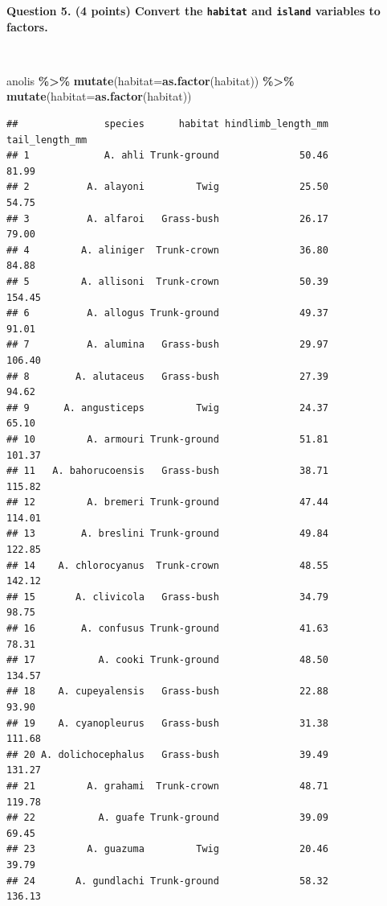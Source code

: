 \documentclass[
]{article}
\newenvironment{Shaded}{\begin{snugshade}}{\end{snugshade}}
\newcommand{\AttributeTok}[1]{\textcolor[rgb]{0.13,0.29,0.53}{#1}}
\newcommand{\FunctionTok}[1]{\textcolor[rgb]{0.13,0.29,0.53}{\textbf{#1}}}
\newcommand{\NormalTok}[1]{#1}
\newcommand{\SpecialCharTok}[1]{\textcolor[rgb]{0.81,0.36,0.00}{\textbf{#1}}}
\begin{document}
\textbf{Question 5. (4 points) Convert the \texttt{habitat} and
\texttt{island} variables to factors.}\\
\strut \\

\begin{Shaded}
\begin{Highlighting}[]
\NormalTok{anolis }\SpecialCharTok{\%\textgreater{}\%} 
  \FunctionTok{mutate}\NormalTok{(}\AttributeTok{habitat=}\FunctionTok{as.factor}\NormalTok{(habitat)) }\SpecialCharTok{\%\textgreater{}\%} 
  \FunctionTok{mutate}\NormalTok{(}\AttributeTok{habitat=}\FunctionTok{as.factor}\NormalTok{(habitat)) }
\end{Highlighting}
\end{Shaded}

\begin{verbatim}
##               species      habitat hindlimb_length_mm tail_length_mm
## 1             A. ahli Trunk-ground              50.46          81.99
## 2          A. alayoni         Twig              25.50          54.75
## 3          A. alfaroi   Grass-bush              26.17          79.00
## 4         A. aliniger  Trunk-crown              36.80          84.88
## 5         A. allisoni  Trunk-crown              50.39         154.45
## 6          A. allogus Trunk-ground              49.37          91.01
## 7          A. alumina   Grass-bush              29.97         106.40
## 8        A. alutaceus   Grass-bush              27.39          94.62
## 9      A. angusticeps         Twig              24.37          65.10
## 10         A. armouri Trunk-ground              51.81         101.37
## 11   A. bahorucoensis   Grass-bush              38.71         115.82
## 12         A. bremeri Trunk-ground              47.44         114.01
## 13        A. breslini Trunk-ground              49.84         122.85
## 14    A. chlorocyanus  Trunk-crown              48.55         142.12
## 15       A. clivicola   Grass-bush              34.79          98.75
## 16        A. confusus Trunk-ground              41.63          78.31
## 17           A. cooki Trunk-ground              48.50         134.57
## 18    A. cupeyalensis   Grass-bush              22.88          93.90
## 19    A. cyanopleurus   Grass-bush              31.38         111.68
## 20 A. dolichocephalus   Grass-bush              39.49         131.27
## 21         A. grahami  Trunk-crown              48.71         119.78
## 22           A. guafe Trunk-ground              39.09          69.45
## 23         A. guazuma         Twig              20.46          39.79
## 24       A. gundlachi Trunk-ground              58.32         136.13

\end{verbatim}
\end{document}
